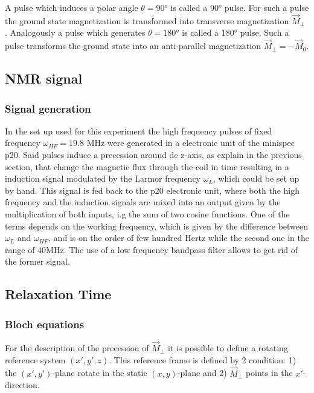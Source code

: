 A pulse which induces a  polar angle $\theta = 90$° is called a 90° pulse. For such a pulse the ground state magnetization is transformed into transverse magnetization $\vec{M}_{\perp}$ %
. Analogously a pulse which generates $\theta = 180°$ is called a 180° pulse. Such a pulse transforms the ground state into an anti-parallel magnetization $\vec{M}_{\perp} = -\vec{M}_0$. %
\subsection{NMR signal}
\subsubsection{Signal generation}
In the set up used for this experiment the high frequency pulses of fixed frequency $\omega_{HF} = 19.8$ MHz were generated in a electronic unit of the minispec p20. Said pulses induce a precession around de z-axis, as explain in the previous section, that change the magnetic flux through the coil in time resulting in a induction signal modulated by the Larmor frequency $\omega_L$, which could be set up by hand. This signal is fed back to the p20 electronic unit, where both the high frequency and the induction signals are mixed into an output given by the multiplication of both inputs, i.g the sum of two cosine functions. One of the terms depends on the working frequency, which is given by the difference between $\omega_L$ and $\omega_{HF}$, and is on the order of few hundred Hertz while the second one in the range of 40MHz. The use of a low frequency bandpass filter allows to get rid of the former signal.   
\subsection{Relaxation Time}
\subsubsection{Bloch equations}
For the description of the precession of $\vec{M}_{\perp}$ it is possible to define a rotating reference system $(x', y', z)$. This reference frame is defined by 2 condition: 1) the $(x', y')$-plane rotate in the static $(x, y)$-plane and 2) $\vec{M}_{\perp}$ points in the $x'$-direction.

